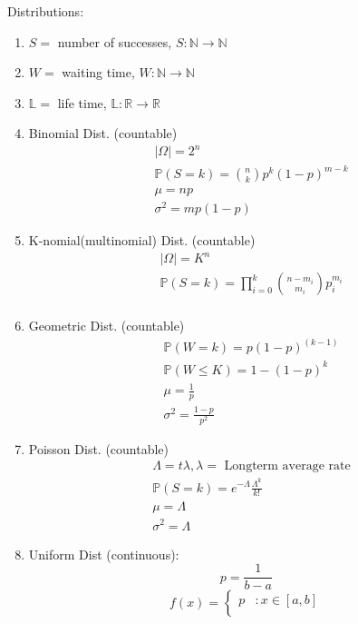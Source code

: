 \documentclass[12pt]{article}
\newcommand{\abs}[1]{\left| #1 \right|} %
\renewcommand{\=}[1]{\stackrel{#1}{=}} %
\theoremstyle{definition}
\theoremstyle{remark}
\begin{document}
Distributions:
\begin{enumerate}
\item $S = $ number of successes, $S: \mathbb{N} \rightarrow \mathbb{N}$
\item $W=$ waiting time, $W:\mathbb{N} \rightarrow \mathbb{N}$
\item $\mathbb{L}=$ life time, $\mathbb{L}: \mathbb{R} \rightarrow \mathbb{R}$
\item Binomial Dist. (countable)
  \begin{align*}
    &\abs{\Omega} = 2^n \\
    &\mathbb{P}(S = k) = \binom{n}{k} p^k(1-p)^{m-k} \\
    &\mu = np \\
    &\sigma^2 = mp(1-p)
  \end{align*}
\item K-nomial(multinomial) Dist. (countable)
  \begin{align*}
    &\abs{\Omega} = K^n \\
    &\mathbb{P}(S = k) = \prod_{i=0}^k \binom{n-m_i}{m_i} p_i^{m_i} \\
  \end{align*}
\item Geometric Dist. (countable)
  \begin{align*}
    &\mathbb{P}(W=k)=p(1-p)^{(k-1)} \\
    &\mathbb{P}(W\leq K) = 1-(1-p)^k \\
    &\mu = \frac{1}{p} \\
    &\sigma^2= \frac{1-p}{p^2}
  \end{align*}
\item Poisson Dist. (countable)
  \begin{align*}
    &\Lambda = t\lambda, \lambda = \textrm{ Longterm average rate} \\
    &\mathbb{P}(S=k) = e^{-\Lambda}\frac{\Lambda^k}{k!} \\
    &\mu = \Lambda \\
    &\sigma^2 = \Lambda
  \end{align*}
\item Uniform Dist (continuous):\\
  \begin{equation}
    p = \frac{1}{b-a}
  \end{equation}
  \begin{displaymath}
    f(x) = \left\{
      \begin{array}{lr}
        p & : x \in [a,b]\\

\end{array}
\end{displaymath}
\end{enumerate}
\end{document}
